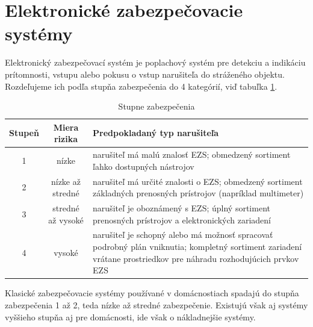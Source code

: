 \section{Elektronické zabezpečovacie systémy}

Elektronický zabezpečovací systém je poplachový systém pre detekciu a indikáciu prítomnosti, vstupu alebo pokusu o vstup narušiteľa do stráženého objektu. Rozdeľujeme ich podľa stupňa zabezpečenia do 4 kategórií, viď tabuľka \ref{tab:stupenzabezpecenia}.
\begin{table}[ht]
    \centering
    \renewcommand{\arraystretch}{1.5}
    \begin{tabular}{|c|c|p{8cm}|}
        \hline
        \textbf{Stupeň} & \textbf{Miera rizika} & \textbf{Predpokladaný typ narušiteľa}\\ \hline
        1& nízke & narušiteľ má malú znalosť EZS; obmedzený sortiment ľahko dostupných nástrojov\\ \hline
        2 & nízke až stredné &narušiteľ má určité znalosti o EZS; obmedzený sortiment základných prenosných prístrojov (napríklad multimeter)\\ \hline
        3 & stredné až vysoké & narušiteľ je oboznámený s EZS; úplný sortiment prenosných prístrojov a elektronických zariadení \\ \hline
        4 & vysoké & narušiteľ je schopný alebo má možnosť spracovať podrobný plán vniknutia; kompletný sortiment zariadení vrátane prostriedkov pre náhradu rozhodujúcich prvkov EZS\\ \hline
    \end{tabular}
    \caption[Stupne zabezpečenia]{Stupne zabezpečenia\cite{csn-en-50131-1}\cite{Krecek}}
    \label{tab:stupenzabezpecenia}
\end{table}

Klasické zabezpečovacie systémy používané v domácnostiach spadajú do stupňa zabezpečenia 1 až 2, teda nízke až stredné zabezpečenie. Existujú však aj systémy vyššieho stupňa aj pre domácnosti, ide však o nákladnejšie systémy.

